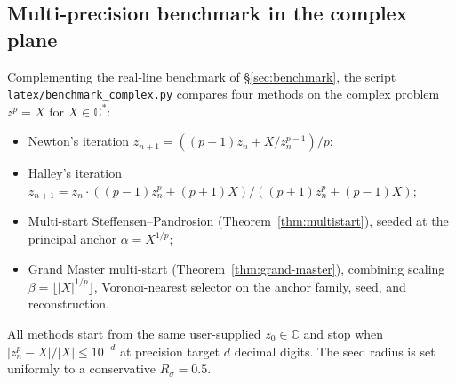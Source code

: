 \documentclass[11pt,a4paper]{article}
\theoremstyle{definition}
\begin{document}
\subsection{Multi-precision benchmark in the complex plane}
\label{sec:benchmark-complex}

Complementing the real-line benchmark of \S\ref{sec:benchmark}, the script \texttt{latex/benchmark\_complex.py} compares four methods on the complex problem $z^p = X$ for $X \in \mathbb{C}^\ast$:
\begin{itemize}
  \item Newton's iteration $z_{n+1} = ((p-1)z_n + X/z_n^{p-1})/p$;
  \item Halley's iteration $z_{n+1} = z_n \cdot ((p-1)z_n^p + (p+1)X)/((p+1)z_n^p + (p-1)X)$;
  \item Multi-start Steffensen--Pandrosion (Theorem~\ref{thm:multistart}), seeded at the principal anchor $\alpha = X^{1/p}$;
  \item Grand Master multi-start (Theorem~\ref{thm:grand-master}), combining scaling $\beta = \lfloor |X|^{1/p} \rfloor$, Voronoï-nearest selector on the anchor family, seed, and reconstruction.
\end{itemize}
All methods start from the same user-supplied $z_0 \in \mathbb{C}$ and stop when $|z_n^p - X|/|X| \leq 10^{-d}$ at precision target $d$ decimal digits. The seed radius is set uniformly to a conservative $R_\sigma = 0.5$.
\end{document}

